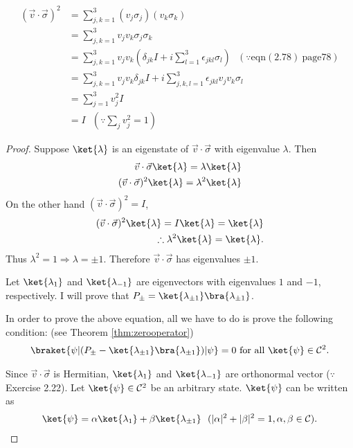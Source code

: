 \documentclass[a4paper,12pt]{article}
\begin{document}
	\begin{align*}
	(\vec{v} \cdot \vec{\sigma})^2 &= \sum_{j,k=1}^3 (v_j \sigma_j)  (v_k \sigma_k)\\
	&= \sum_{j,k=1}^3 v_j v_k \sigma_j \sigma_k\\
	&= \sum_{j,k=1}^3 v_j v_k \left(\delta_{jk}I + i \sum_{l=1}^3 \epsilon_{jkl}\sigma_l \right) ~~~(\because \text{eqn}(2.78)~ \text{page} 78)\\
	&= \sum_{j,k=1}^3 v_j v_k \delta_{jk}I  + i \sum_{j,k,l=1}^3 \epsilon_{jkl} v_j v_k \sigma_l\\
	&= \sum_{j=1}^3 v_j^2 I\\
	&= I ~~~\left(\because \sum_j v_j^2 = 1 \right)
	\end{align*}


	\begin{proof}
		Suppose $\ket{\lambda}$ is an eigenstate of $\vec{v} \cdot \vec{\sigma}$ with eigenvalue $\lambda$. Then
		\begin{align*}
		\vec{v} \cdot \vec{\sigma} \ket{\lambda} = \lambda \ket{\lambda}\\
		(\vec{v} \cdot \vec{\sigma})^2 \ket{\lambda} = \lambda^2 \ket{\lambda}
		\end{align*}
		On the other hand $(\vec{v} \cdot \vec{\sigma})^2 = I$,
		\begin{align*}
		(\vec{v} \cdot \vec{\sigma})^2 \ket{\lambda} = I \ket{\lambda} = \ket{\lambda}\\
		\therefore \lambda^2\ket{\lambda} = \ket{\lambda}.
		\end{align*}
		Thus $\lambda^2 = 1 \Rightarrow \lambda = \pm 1$. Therefore $\vec{v} \cdot \vec{\sigma}$ has eigenvalues $\pm 1$.

		Let $\ket{\lambda_1}$ and $\ket{\lambda_{-1}}$ are eigenvectors with eigenvalues $1$ and $-1$, respectively.
		I will prove that $P_\pm = \ket{\lambda_{\pm 1}}\bra{\lambda_{\pm 1}}$.

		In order to prove the above equation, all we have to do is prove the following condition: (see Theorem \ref{thm:zerooperator})
			\begin{align}
				\braket{\psi | (P_\pm - \ket{\lambda_{\pm 1}}\bra{\lambda_{\pm 1}}) |\psi} = 0 \text{ for all } \ket{\psi} \in \mathcal{C}^2.
			\end{align}

		Since $\vec{v} \cdot \vec{\sigma}$ is Hermitian, $\ket{\lambda_1}$ and $\ket{\lambda_{-1}}$ are orthonormal vector ($\because $ Exercise 2.22).
		Let $\ket{\psi} \in \mathcal{C}^2$ be an arbitrary state. $\ket{\psi}$ can be written as
		\begin{align*}
		\ket{\psi} = \alpha \ket{\lambda_1} + \beta \ket{\lambda_{\pm 1}} ~~(|\alpha|^2 + |\beta|^2 = 1, \alpha, \beta \in \mathcal{C}).
		\end{align*}


\end{proof}
\end{document}
